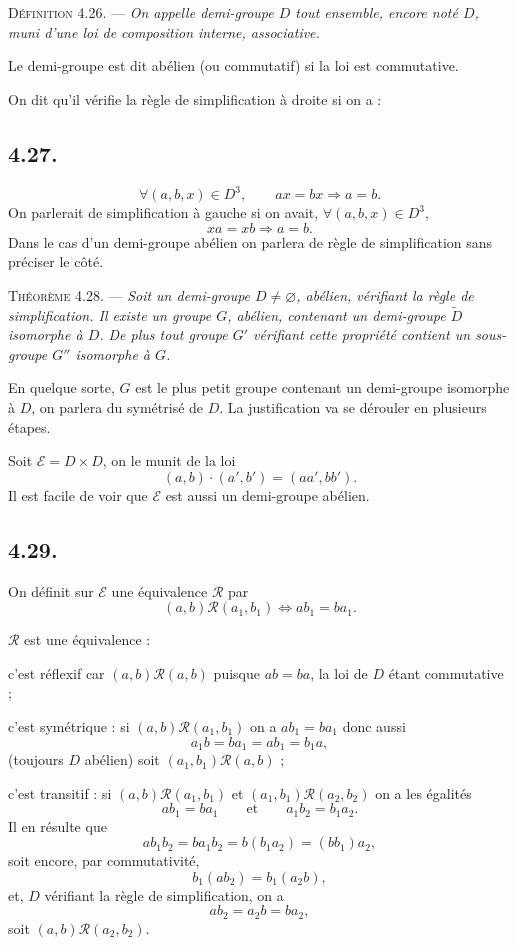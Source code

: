 
\medskip\noindent\textsc{Définition 4.26.} --- \emph{On appelle demi-groupe $D$ tout ensemble, encore noté $D$, muni d'une loi de composition interne, associative.}

Le demi-groupe est dit abélien (ou commutatif) si la loi est commutative.

On dit qu'il vérifie la règle de simplification à droite si on a :

\subsection*{4.27.}
\[
\forall(a,b,x)\in D^3,\qquad ax=bx\Rightarrow a=b.
\]
On parlerait de simplification à gauche si on avait, $\forall(a,b,x)\in D^3$,
\[
xa=xb\Rightarrow a=b.
\]
Dans le cas d'un demi-groupe abélien on parlera de règle de simplification sans préciser le côté.

\medskip\noindent\textsc{Théorème 4.28.} --- \emph{Soit un demi-groupe $D\ne\varnothing$, abélien, vérifiant la règle de simplification. Il existe un groupe $G$, abélien, contenant un demi-groupe $\widetilde D$ isomorphe à $D$. De plus tout groupe $G'$ vérifiant cette propriété contient un sous-groupe $G''$ isomorphe à $G$.}

En quelque sorte, $G$ est le plus petit groupe contenant un demi-groupe isomorphe à $D$, on parlera du symétrisé de $D$. La justification va se dérouler en plusieurs étapes.

Soit $\mathcal E=D\times D$, on le munit de la loi
\[
(a,b)\cdot(a',b')=(aa',bb').
\]
Il est facile de voir que $\mathcal E$ est aussi un demi-groupe abélien.

\subsection*{4.29.}
On définit sur $\mathcal E$ une équivalence $\mathcal R$ par
\[
(a,b)\mathcal R(a_1,b_1)\Longleftrightarrow ab_1=ba_1.
\]

$\mathcal R$ est une équivalence :

c'est réflexif car $(a,b)\mathcal R(a,b)$ puisque $ab=ba$, la loi de $D$ étant commutative ;

c'est symétrique : si $(a,b)\mathcal R(a_1,b_1)$ on a $ab_1=ba_1$ donc aussi
\[
a_1b=ba_1=ab_1=b_1a,
\]
(toujours $D$ abélien) soit $(a_1,b_1)\mathcal R(a,b)$ ;

c'est transitif : si $(a,b)\mathcal R(a_1,b_1)$ et $(a_1,b_1)\mathcal R(a_2,b_2)$ on a les égalités
\[
ab_1=ba_1\qquad\text{et}\qquad a_1b_2=b_1a_2.
\]
Il en résulte que
\[
ab_1b_2=ba_1b_2=b(b_1a_2)=(bb_1)a_2,
\]
soit encore, par commutativité,
\[
b_1(ab_2)=b_1(a_2b),
\]
et, $D$ vérifiant la règle de simplification, on a
\[
ab_2=a_2b=ba_2,
\]
soit $(a,b)\mathcal R(a_2,b_2)$. \bookend

